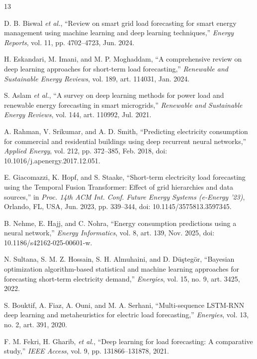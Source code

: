 \documentclass{ieeeaccess}
\begin{document}
\begingroup
\footnotesize
\setlength{\itemsep}{-2pt}
\begin{thebibliography}{13}

 D. B. Biswal \emph{et al.}, ``Review on smart grid load forecasting for smart energy management using machine learning and deep learning techniques,'' \emph{Energy Reports}, vol. 11, pp. 4702--4723, Jun. 2024.

 H. Eskandari, M. Imani, and M. P. Moghaddam, ``A comprehensive review on deep learning approaches for short-term load forecasting,'' \emph{Renewable and Sustainable Energy Reviews}, vol. 189, art. 114031, Jan. 2024.

 S. Aslam \emph{et al.}, ``A survey on deep learning methods for power load and renewable energy forecasting in smart microgrids,'' \emph{Renewable and Sustainable Energy Reviews}, vol. 144, art. 110992, Jul. 2021.

 A. Rahman, V. Srikumar, and A. D. Smith, ``Predicting electricity consumption for commercial and residential buildings using deep recurrent neural networks,'' \emph{Applied Energy}, vol. 212, pp. 372--385, Feb. 2018, doi: 10.1016/j.apenergy.2017.12.051.

 E. Giacomazzi, K. Hopf, and S. Staake, ``Short-term electricity load forecasting using the Temporal Fusion Transformer: Effect of grid hierarchies and data sources,'' in \emph{Proc. 14th ACM Int. Conf. Future Energy Systems (e-Energy '23)}, Orlando, FL, USA, Jun. 2023, pp. 339--344, doi: 10.1145/3575813.3597345.

 B. Nehme, E. Hajj, and C. Nohra, ``Energy consumption predictions using a neural network,'' \emph{Energy Informatics}, vol. 8, art. 139, Nov. 2025, doi: 10.1186/s42162-025-00601-w.

 N. Sultana, S. M. Z. Hossain, S. H. Almuhaini, and D. Düştegör, ``Bayesian optimization algorithm-based statistical and machine learning approaches for forecasting short-term electricity demand,'' \emph{Energies}, vol. 15, no. 9, art. 3425, 2022.

 S. Bouktif, A. Fiaz, A. Ouni, and M. A. Serhani, ``Multi-sequence LSTM-RNN deep learning and metaheuristics for electric load forecasting,'' \emph{Energies}, vol. 13, no. 2, art. 391, 2020.

 F. M. Fekri, H. Gharib, \emph{et al.}, ``Deep learning for load forecasting: A comparative study,'' \emph{IEEE Access}, vol. 9, pp. 131866--131878, 2021.


\end{thebibliography}
\end{document}
